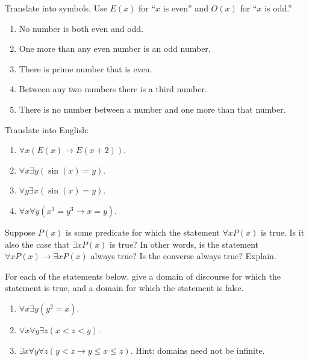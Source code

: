 \documentclass[11pt,]{book}
\theoremstyle{ptxplainnotitle}
\theoremstyle{ptxplaintitle}
\theoremstyle{ptxdefinitionnotitle}
\theoremstyle{ptxdefinitiontitle}
\theoremstyle{ptxdefinitionnotitle}
\theoremstyle{ptxdefinitiontitle}
\theoremstyle{ptxdefinitionnotitle}
\theoremstyle{ptxdefinitiontitle}
\theoremstyle{ptxdefinitiontitlenonumber}
\theoremstyle{ptxdefinitiontitlenonumber}
\numberwithin{equation}{chapter}
\newcommand{\imp}{\rightarrow}
\newcommand{\lt}{<}
\begin{document}
\begin{divisionexercise}{17}\hypertarget{exercise-165}{}
\hypertarget{p-2328}{}%
Translate into symbols. Use \(E(x)\) for ``\(x\) is even'' and \(O(x)\) for ``\(x\) is odd.'' \leavevmode%
\begin{enumerate}[label=(\alph*)]
\item\hypertarget{li-1207}{}\hypertarget{p-2329}{}%
No number is both even and odd.%
\item\hypertarget{li-1208}{}\hypertarget{p-2330}{}%
One more than any even number is an odd number.%
\item\hypertarget{li-1209}{}\hypertarget{p-2331}{}%
There is prime number that is even.%
\item\hypertarget{li-1210}{}\hypertarget{p-2332}{}%
Between any two numbers there is a third number.%
\item\hypertarget{li-1211}{}\hypertarget{p-2333}{}%
There is no number between a number and one more than that number.%
\end{enumerate}
%
\end{divisionexercise}%
\begin{divisionexercise}{18}\hypertarget{exercise-166}{}
\hypertarget{p-2335}{}%
Translate into English: \leavevmode%
\begin{enumerate}[label=(\alph*)]
\item\hypertarget{li-1217}{}\(\forall x (E(x) \imp E(x +2))\).%
\item\hypertarget{li-1218}{}\(\forall x \exists y (\sin(x) = y)\).%
\item\hypertarget{li-1219}{}\(\forall y \exists x (\sin(x) = y)\).%
\item\hypertarget{li-1220}{}\(\forall x \forall y (x^3 = y^3 \imp x = y)\).%
\end{enumerate}
%
\end{divisionexercise}%
\begin{divisionexercise}{19}\hypertarget{exercise-167}{}
\hypertarget{p-2341}{}%
Suppose \(P(x)\) is some predicate for which the statement \(\forall x P(x)\) is true. Is it also the case that \(\exists x P(x)\) is true? In other words, is the statement \(\forall x P(x) \imp \exists x P(x)\) always true? Is the converse always true? Explain.%
\end{divisionexercise}%
\begin{divisionexercise}{20}\hypertarget{exercise-168}{}
\hypertarget{p-2343}{}%
For each of the statements below, give a domain of discourse for which the statement is true, and a domain for which the statement is false. \leavevmode%
\begin{enumerate}[label=(\alph*)]
\item\hypertarget{li-1225}{}\(\forall x \exists y (y^2 = x)\).%
\item\hypertarget{li-1226}{}\(\forall x \forall y \exists z (x \lt  z \lt  y)\).%
\item\hypertarget{li-1227}{}\(\exists x \forall y \forall z (y \lt  z \imp y \le x \le z)\).  Hint: domains need not be infinite.%
\end{enumerate}
%
\end{divisionexercise}%
\end{document}
